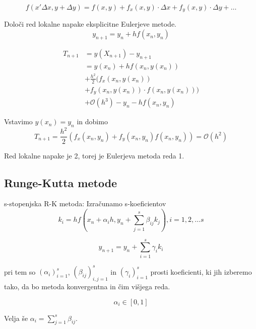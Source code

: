 \documentclass[a4paper,12pt]{article}
\theoremstyle{definition}
\theoremstyle{remark}
\begin{document}
\begin{equation*}
    f(x ' \Delta x, y + \Delta y) = f(x, y) + f_x(x, y) \cdot \Delta x + f_y(x,y) \cdot \Delta y + \dots
\end{equation*}

Določi red lokalne napake eksplicitne Eulerjeve metode.
\begin{equation*}
    y_{n+1} = y_n + h f(x_n, y_n)
\end{equation*}

\begin{align*}
    T_{n+1} &= y(X_{n+1}) - y_{n+1} \\
            &= y(x_n) + h f(x_n, y(x_n)) \\
            &+ \frac{h^2}{2} (f_x(x_n, y(x_n)) \\
            &+ f_y(x_n, y(x_n))\cdot f(x_n, y(x_n))) \\
            &+ \mathcal{O}(h^3) - y_n - h f(x_n, y_n)
\end{align*}

Vstavimo $y(x_n) = y_n$ in dobimo
\begin{equation*}
    T_{n+1} = \frac{h^2}{2} (f_x(x_n, y_n) + f_y(x_n, y_n)f(x_n, y_n)) = \mathcal{O}(h^2)
\end{equation*}

Red lokalne napake je 2, torej je Eulerjeva metoda reda 1.

\subsection{Runge-Kutta metode}
s-stopenjska R-K metoda:
Izračunamo s-koeficientov
\begin{equation*}
    k_i = h f(x_n + \alpha_i h, y_n + \sum_{j=1}^{s} \beta_{ij} k_j), i = 1, 2, \dots s    
\end{equation*}

\begin{equation*}
    y_{n+1} = y_n + \sum_{i=1}^{s} \gamma_i k_i 
\end{equation*}

pri tem so $(\alpha_i)_{i=1}^s$, $(\beta_{ij})_{i, j=1}^s$ in $(\gamma_i)_{i=1}^s$ prosti koeficienti, ki jih izberemo tako,
da bo metoda konvergentna in čim višjega reda.

\begin{equation*}
    \alpha_i \in [0, 1]
\end{equation*}

Velja še $\alpha_i = \sum_{j=1}^{s} \beta_{ij}$.
\end{document}
